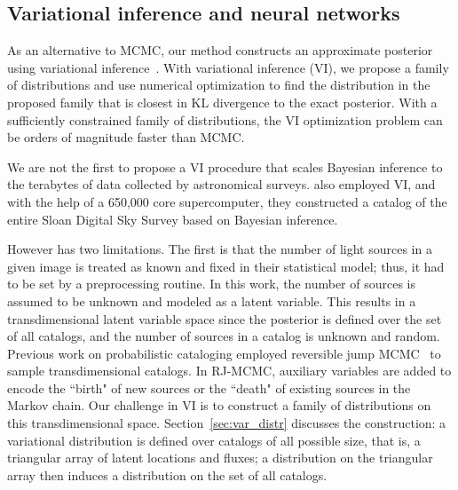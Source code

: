 \subsection{Variational inference and neural networks}
As an alternative to MCMC, our method constructs an approximate posterior using variational inference~\cite{Blei_2017_vi_review,Jordan_intro_vi, Wainwrite_graph_models_vi}.
With variational inference (VI), we propose a family of distributions and use numerical optimization to find the distribution 
in the proposed family that is closest 
in KL divergence to the exact posterior. 
With a sufficiently constrained family of distributions, the VI optimization problem can be orders of magnitude faster than MCMC. 

We are not the first to propose a VI procedure
that scales Bayesian inference to the terabytes of data collected by astronomical surveys. 
\cite{regier2019_celeste} also employed 
VI, and with the help of a 650,000 core supercomputer, they constructed a catalog of the entire Sloan Digital Sky Survey based on Bayesian inference. 

However \cite{regier2019_celeste} has two limitations. The first is that the number of light sources in a given image is treated as known and fixed in their statistical model; thus, it had to be set by a preprocessing routine. In this work, the number of sources is assumed to be unknown and modeled as a latent variable. 
This results in a transdimensional latent variable space 
since the posterior is defined over the set of all catalogs, and the number of sources in a catalog is unknown and random.
Previous work on probabilistic cataloging employed reversible jump MCMC~\cite{Green95reversiblejump} to sample transdimensional catalogs. In RJ-MCMC, auxiliary variables are added to encode the ``birth" of new sources 
or the ``death" of existing sources in the Markov chain. 
Our challenge in VI is to construct a family of distributions on this transdimensional space.
Section~\ref{sec:var_distr} discusses the construction: 
a variational distribution is defined over catalogs of all possible size, that is, a triangular array of latent locations and fluxes; 
a distribution on the triangular array then induces a distribution on the set of all catalogs.

